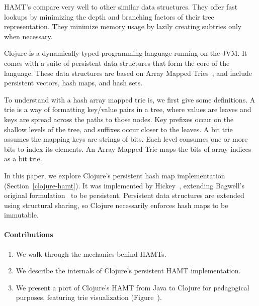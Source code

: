 \documentclass[preprint]{sigplanconf}
\begin{document}



HAMT's compare very well to other similar data structures.
They offer fast lookups by minimizing the depth and
branching factors of their tree representation.
They minimize memory usage by lazily creating subtries
only when necessary. 

Clojure is a dynamically typed programming language
running on the JVM.
It comes with a suite of persistent data structures
that form the core of the language.
These data structures are based on Array Mapped Tries~\cite{bagwell2000fast},
and include persistent vectors, hash maps, and hash sets.

To understand with a hash array mapped trie is, 
we first give some definitions.
A trie is a way of formatting key/value pairs
in a tree, where values are leaves and keys are spread
across the paths to those nodes.
Key prefixes occur on the shallow levels of the tree,
and suffixes occur closer to the leaves.
A bit trie assumes the mapping keys are strings
of bits. Each level consumes one or more bits to index
its elements.
An Array Mapped Trie
maps the bits of array indices as a bit trie.

In this paper, we explore Clojure's persistent hash
map implementation
(Section~\ref{clojure-hamt}).
It was implemented by Hickey~\cite{hickey2008clojure}, extending
Bagwell's original formulation~\cite{bagwell2001ideal}
to be persistent.
Persistent data structures are extended using structural sharing,
so Clojure necessarily enforces hash maps to be immutable.


\paragraph{Contributions}

\begin{enumerate}
  \item We walk through the mechanics behind HAMTs.
  \item We describe the internals of Clojure's persistent HAMT implementation.
  \item We present a port of Clojure's HAMT from Java to Clojure
    for pedagogical purposes,
    featuring trie visualization (Figure~\label{port-visualize}).
\end{enumerate}
\end{document}
